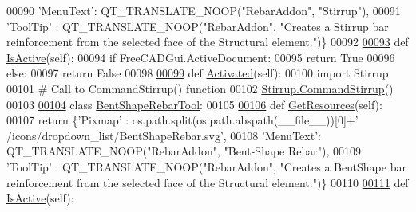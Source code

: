 \begin{DoxyCode}
00090                 \textcolor{stringliteral}{'MenuText'}: QT\_TRANSLATE\_NOOP(\textcolor{stringliteral}{"RebarAddon"}, \textcolor{stringliteral}{"Stirrup"}),
00091                 \textcolor{stringliteral}{'ToolTip'} : QT\_TRANSLATE\_NOOP(\textcolor{stringliteral}{"RebarAddon"}, \textcolor{stringliteral}{"Creates a Stirrup bar reinforcement from the
       selected face of the Structural element."})\}
00092 
\hypertarget{RebarTools_8py_source.tex_l00093}{}\hyperlink{classRebarTools_1_1StirrupTool_a7b94e476610d82023e0ac1a0e344f5f8}{00093}     \textcolor{keyword}{def }\hyperlink{classRebarTools_1_1StirrupTool_a7b94e476610d82023e0ac1a0e344f5f8}{IsActive}(self):
00094         \textcolor{keywordflow}{if} FreeCADGui.ActiveDocument:
00095             \textcolor{keywordflow}{return} \textcolor{keyword}{True}
00096         \textcolor{keywordflow}{else}:
00097             \textcolor{keywordflow}{return} \textcolor{keyword}{False}
00098 
\hypertarget{RebarTools_8py_source.tex_l00099}{}\hyperlink{classRebarTools_1_1StirrupTool_a8ab82071978a99ee1f68cbf5b971ac8a}{00099}     \textcolor{keyword}{def }\hyperlink{classRebarTools_1_1StirrupTool_a8ab82071978a99ee1f68cbf5b971ac8a}{Activated}(self):
00100         \textcolor{keyword}{import} Stirrup
00101         \textcolor{comment}{# Call to CommandStirrup() function}
00102         \hyperlink{namespaceStirrup_a3863ce61c716794557101a50f41597b5}{Stirrup.CommandStirrup}()
00103 
\hypertarget{RebarTools_8py_source.tex_l00104}{}\hyperlink{classRebarTools_1_1BentShapeRebarTool}{00104} \textcolor{keyword}{class }\hyperlink{classRebarTools_1_1BentShapeRebarTool}{BentShapeRebarTool}:
00105 
\hypertarget{RebarTools_8py_source.tex_l00106}{}\hyperlink{classRebarTools_1_1BentShapeRebarTool_a726f9762c589715cfa91f3b261c83567}{00106}     \textcolor{keyword}{def }\hyperlink{classRebarTools_1_1BentShapeRebarTool_a726f9762c589715cfa91f3b261c83567}{GetResources}(self):
00107         \textcolor{keywordflow}{return} \{\textcolor{stringliteral}{'Pixmap'}  : os.path.split(os.path.abspath(\_\_file\_\_))[0]+\textcolor{stringliteral}{'
      /icons/dropdown\_list/BentShapeRebar.svg'},
00108                 \textcolor{stringliteral}{'MenuText'}: QT\_TRANSLATE\_NOOP(\textcolor{stringliteral}{"RebarAddon"}, \textcolor{stringliteral}{"Bent-Shape Rebar"}),
00109                 \textcolor{stringliteral}{'ToolTip'} : QT\_TRANSLATE\_NOOP(\textcolor{stringliteral}{"RebarAddon"}, \textcolor{stringliteral}{"Creates a BentShape bar reinforcement from the
       selected face of the Structural element."})\}
00110 
\hypertarget{RebarTools_8py_source.tex_l00111}{}\hyperlink{classRebarTools_1_1BentShapeRebarTool_a517fe05d554f10cb7a01524fe4d46f4e}{00111}     \textcolor{keyword}{def }\hyperlink{classRebarTools_1_1BentShapeRebarTool_a517fe05d554f10cb7a01524fe4d46f4e}{IsActive}(self):

\end{DoxyCode}
